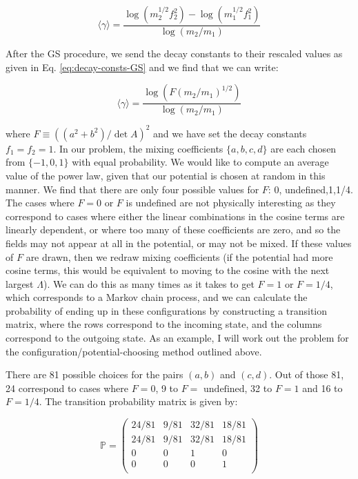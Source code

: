 \documentclass{article}
\begin{document}
\begin{equation}
    \label{eq:power-law}
    \langle \gamma \rangle = \frac{\log{(m_2^{1/2}f_2^2)}-\log{(m_1^{1/2}f_1^2)}}{\log{(m_2/m_1)}}
\end{equation}

After the GS procedure, we send the decay constants to their rescaled values as given in Eq. \eqref{eq:decay-consts-GS} and we find that we can write:

\begin{equation}
    \label{eq:GS-exp-gamma}
    \langle \gamma \rangle = \frac{\log{(F(m_2/m_1)^{1/2})}}{\log{(m_2/m_1)}}
\end{equation}
 
\noindent where $F \equiv ((a^2+b^2)/\det{A})^2$ and we have set the decay constants $f_1=f_2=1$. In our problem, the mixing coefficients $\{a,b,c,d\}$ are each chosen from $\{-1,0,1\}$ with equal probability. We would like to compute an average value of the power law, given that our potential is chosen at random in this manner. We find that there are only four possible values for $F$: 0, undefined,1,1/4. The cases where $F=0$ or $F$ is undefined are not physically interesting as they correspond to cases where either the linear combinations in the cosine terms are linearly dependent, or where too many of these coefficients are zero, and so the fields may not appear at all in the potential, or may not be mixed. If these values of $F$ are drawn, then we redraw mixing coefficients (if the potential had more cosine terms, this would be equivalent to moving to the cosine with the next largest $\Lambda$). We can do this as many times as it takes to get $F=1$ or $F=1/4$, which corresponds to a Markov chain process, and we can calculate the probability of ending up in these configurations by constructing a transition matrix, where the rows correspond to the incoming state, and the columns correspond to the outgoing state. As an example, I will work out the problem for the configuration/potential-choosing method outlined above. 

There are 81 possible choices for the pairs $(a,b)$ and $(c,d)$. Out of those 81, 24 correspond to cases where $F=0$, 9 to $F= \text{ undefined}$, 32 to $F=1$ and 16 to $F=1/4$. The transition probability matrix is given by:

\begin{equation}
\mathbb{P}=
    \begin{pmatrix}
        24/81 & 9/81 & 32/81 & 18/81 \\
        24/81 & 9/81 & 32/81 & 18/81 \\
        0 & 0 & 1 & 0 \\
        0 & 0 & 0 & 1 \\
    \end{pmatrix}
\end{equation}
\end{document}
